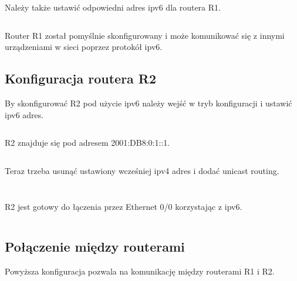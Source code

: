 \documentclass[a4paper,12pt,notitlepage]{article}
\begin{document}
Należy także ustawić odpowiedni adres ipv6 dla routera R1.%
\inputminted[label=Ustawianie adresu ipv6 dla R1, firstline=237, lastline=238]{text}{R1.txt}

Router R1 został pomyślnie skonfigurowany i może komunikować się z innymi urządzeniami w sieci poprzez protokół ipv6.

\subsection{Konfiguracja routera R2}

By skonfigurować R2 pod użycie ipv6 należy wejść w tryb konfiguracji i ustawić ipv6 adres.
\inputminted[label=Ustawianie ipv6 dla R2, firstline=272, lastline=283]{text}{R2.txt}
R2 znajduje się pod adresem 2001:DB8:0:1::1.
\inputminted[label=R2 z ustawionym ipv6, firstline=309, lastline=313]{text}{R2.txt}
Teraz trzeba usunąć ustawiony wcześniej ipv4 adres i dodać unicast routing.
\inputminted[label=Usunięcie ipv4, firstline=324, lastline=329]{text}{R2.txt}
\inputminted[label=Dodanie unicast routing, firstline=376, lastline=382]{text}{R2.txt}
R2 jest gotowy do łączenia przez Ethernet 0/0 korzystając z ipv6.
\inputminted[label=Końcowa konfiguracja R2 dla ipv6, firstline=383, lastline=402]{text}{R2.txt}

\subsection{Połączenie między routerami}

Powyższa konfiguracja pozwala na komunikację między routerami R1 i R2.%
\inputminted[label=Próba komunikacji R2 z R1, firstline=416, lastline=421]{text}{R2.txt}%
\inputminted[label=Próba komunikacji R1 z R2, firstline=248, lastline=253]{text}{R1.txt}
\end{document}
